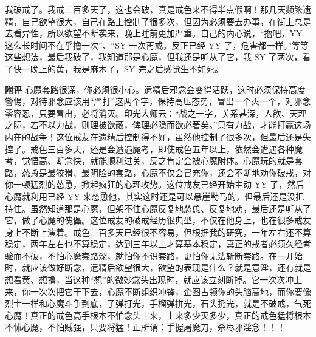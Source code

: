 \begin{case}
    我破戒了。我戒三百多天了，这也会破，真是戒色来不得半点假啊！那几天频繁遗精，自己欲望很大，自己在路上控制了很多次，但因为必须要去办事，在街上总是去看异性，所以欲望不断袭来，晚上睡前更加严重。自己的内心说，“撸吧，YY 这么长时间不在乎撸一次”、“SY 一次再戒，反正已经 YY 了，危害都一样。”等等这些想法，最后我破了，我知道那是心魔，但我还是听从了它，我 SY 了两次，看了快一晚上的黄，我是麻木了，SY 完之后感觉生不如死。

    \textbf{附评} 心魔套路很深，你必须很小心。遗精后邪念会变得活跃，这时必须保持高度警惕，对待邪念应该用“严打”这两个字，保持高压态势，冒出一个灭一个，对邪念零容忍，只要冒出，必将消灭。印光大师云：“战之一字，关系甚深，人欲、天理之际，若不以力战，则理被欲蔽，俾理必隐而欲必著矣。”只有力战，才能打赢这场内在的战争！这位戒友在遗精后控制得不好，虽然他控制了很多次，但最后还是失控了。戒色三百多天，还是会遭遇魔考，即使戒色五年以上，依然会遭遇各种魔考，觉悟高、断念快，就能顺利过关，反之肯定会被心魔附体。心魔玩的就是套路，怂恿是最狡猾、最阴险的套路，心魔不仅会冒充你，还会不断地劝你破戒，对你一顿猛烈的怂恿，掀起疯狂的心理攻势。这位戒友已经开始主动 YY 了，然后心魔就利用已经 YY 来怂恿他，其实这时还是可以悬崖勒马的，但最后还是没把持住。虽然知道那是心魔，但架不住心魔反复地怂恿、反复地劝，最后还是听从了它，做了心魔的傀儡。这位戒友的破戒经历很典型，不仅在他身上，也在很多戒友身上不断上演着。戒色三百多天已经很不容易，但根据我的研究，一年左右还不算稳定，两年左右也不算稳定，达到三年以上才算基本稳定，真正的戒者必须久经考验而不破，不怕心魔套路深，就怕你不识套路，更怕你无法斩断套路。在一开始时，就应该做好断念，遗精后欲望很大，欲望的表现是什么？就是意淫，还有就是想看黄、想撸，当这种“想”的微妙念头出现时，就应该立刻断掉。它一次次冲上来，你一次次把它干下去，心魔不断组织冲锋，企图占领你的头脑高地，而你要像烈士一样和心魔斗争到底，子弹打光，手榴弹拼光，石头扔光，就是不破戒，气死心魔！真正的戒色高手根本不怕念头上来，上来多少灭多少，真正的戒色猛将根本不怵心魔，不怕贼强，只要将猛！正所谓：手握屠魔刀，杀尽邪淫念！！！
\end{case}

